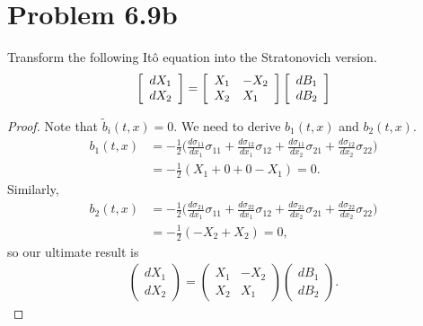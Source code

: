 \documentclass[11pt]{article}
\newcommand{\gs}{\sigma}
\begin{document}
\section*{Problem 6.9b}
Transform the following It\^o equation into the Stratonovich version.
\begin{align*}
\left[ \begin{array} { l } { d X _ { 1 } } \\ { d X _ { 2 } } \end{array} \right] = \left[ \begin{array} { l l } { X _ { 1 } } & { - X _ { 2 } } \\ { X _ { 2 } } & { X _ { 1 } } \end{array} \right] \left[ \begin{array} { l } { d B _ { 1 } } \\ { d B _ { 2 } } \end{array} \right]
\end{align*}
\begin{proof}
Note that $\tilde{b}_i(t,x) = 0$.  We need to derive $b_1(t,x)$ and $b_2(t,x)$.
\begin{align*}
b_1(t,x) &= -\frac{1}{2}  \Big( \frac{d \gs_{11}}{d x_1} \gs_{11} +  \frac{d \gs_{12}}{d x_1} \gs_{12} + \frac{d \gs_{11}}{d x_2} \gs_{21}+ \frac{d \gs_{12}}{d x_2} \gs_{22} \Big)\\
&= - \frac{1}{2}(X_1 + 0 + 0 - X_1) = 0.
\end{align*}
Similarly, 
\begin{align*}
b_2(t,x) &= -\frac{1}{2}  \Big( \frac{d \gs_{21}}{d x_1} \gs_{11} +  \frac{d \gs_{22}}{d x_1} \gs_{12} + \frac{d \gs_{21}}{d x_2} \gs_{21}+ \frac{d \gs_{22}}{d x_2} \gs_{22} \Big)\\
&= -\frac{1}{2}(-X_2 + X_2) = 0,
\end{align*}
so our ultimate result is
\begin{align*}
\begin{pmatrix}
dX_1 \\ dX_2
\end{pmatrix} = 
\begin{pmatrix}
X_1 & -X_2 \\ X_2 & X_1 
\end{pmatrix}
\begin{pmatrix}
dB_1 \\ dB_2 
\end{pmatrix}.
\end{align*}
\end{proof}
\end{document}
